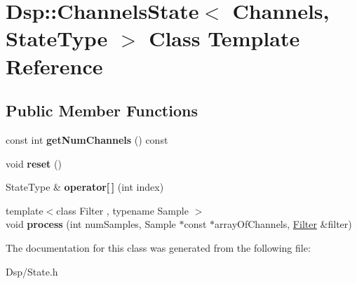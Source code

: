 \hypertarget{classDsp_1_1ChannelsState}{\section{Dsp\-:\-:Channels\-State$<$ Channels, State\-Type $>$ Class Template Reference}
\label{classDsp_1_1ChannelsState}
}
\subsection*{Public Member Functions}
\begin{DoxyCompactItemize}
\item 
\hypertarget{classDsp_1_1ChannelsState_abfd9e99b452edc987bdfdd06b091de6c}{const int {\bfseries get\-Num\-Channels} () const }\label{classDsp_1_1ChannelsState_abfd9e99b452edc987bdfdd06b091de6c}

\item 
\hypertarget{classDsp_1_1ChannelsState_a48d8518f3135bb906384afb9fb2b22d6}{void {\bfseries reset} ()}\label{classDsp_1_1ChannelsState_a48d8518f3135bb906384afb9fb2b22d6}

\item 
\hypertarget{classDsp_1_1ChannelsState_a61af1c4fd7d7ca2c80f8e6fd317fb182}{State\-Type \& {\bfseries operator\mbox{[}$\,$\mbox{]}} (int index)}\label{classDsp_1_1ChannelsState_a61af1c4fd7d7ca2c80f8e6fd317fb182}

\item 
\hypertarget{classDsp_1_1ChannelsState_a2bf726158daac943d17c5edf6f48f25d}{{\footnotesize template$<$class Filter , typename Sample $>$ }\\void {\bfseries process} (int num\-Samples, Sample $\ast$const $\ast$array\-Of\-Channels, \hyperlink{classDsp_1_1Filter}{Filter} \&filter)}\label{classDsp_1_1ChannelsState_a2bf726158daac943d17c5edf6f48f25d}

\end{DoxyCompactItemize}


The documentation for this class was generated from the following file\-:\begin{DoxyCompactItemize}
\item 
Dsp/State.\-h\end{DoxyCompactItemize}
